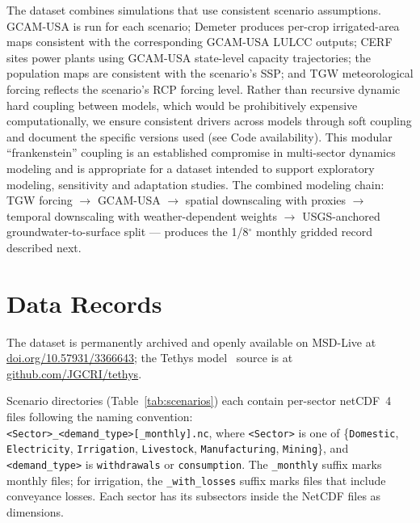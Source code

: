 \documentclass[fleqn,10pt]{wlscirep}
\begin{document}
The dataset combines simulations that use consistent scenario assumptions.  GCAM-USA is run for each scenario; Demeter produces per-crop irrigated-area maps consistent with the corresponding GCAM-USA LULCC outputs; CERF sites power plants using GCAM-USA state-level capacity trajectories; the population maps are consistent with the scenario's SSP; and TGW meteorological forcing reflects the scenario's RCP forcing level. Rather than recursive dynamic hard coupling between models, which would be prohibitively expensive computationally, we ensure consistent drivers across models through soft coupling and document the specific versions used (see Code availability). This modular ``frankenstein'' coupling is an established compromise in multi-sector dynamics modeling\cite{Khan2023, hess-17-4555-2013, hejazi2014, superwell, glory} and is appropriate for a dataset intended to support exploratory modeling, sensitivity and adaptation studies. The combined modeling chain: TGW forcing $\to$ GCAM-USA $\to$ spatial downscaling with proxies $\to$ temporal downscaling with weather-dependent weights $\to$ USGS-anchored groundwater-to-surface split --- produces the 1/8$^{\circ}$ monthly gridded record described next.

\section*{Data Records}

The dataset is permanently archived and openly available on MSD-Live\cite{bracken2026TethysDataSet} at \href{https://doi.org/10.57931/3366643}{doi.org/10.57931/3366643}; the Tethys model~\cite{niazi_2026_20552731} source is at \href{https://github.com/JGCRI/tethys}{github.com/JGCRI/tethys}.

Scenario directories (Table~\ref{tab:scenarios}) each contain per-sector netCDF~4 files following the naming convention:\\\texttt{<Sector>\_<demand\_type>[\_monthly].nc}, where \texttt{<Sector>} is one of \{\texttt{Domestic}, \texttt{Electricity}, \texttt{Irrigation}, \texttt{Livestock}, \texttt{Manufacturing}, \texttt{Mining}\}, and \texttt{<demand\_type>} is \texttt{withdrawals} or \texttt{consumption}. The \texttt{\_monthly} suffix marks monthly files; for irrigation, the \texttt{\_with\_losses} suffix marks files that include conveyance losses. Each sector has its subsectors inside the NetCDF files as dimensions. 
\end{document}
